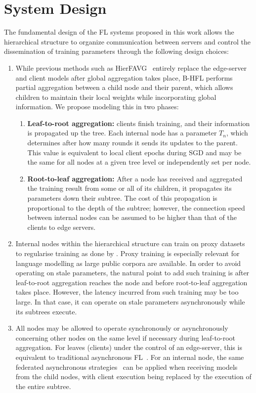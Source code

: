 \section{System Design}

The fundamental design of the FL systems proposed in this work allows the hierarchical structure to organize communication between servers and control the dissemination of training parameters through the following design choices:

\begin{enumerate}
    \item While previous methods such as HierFAVG~\citep{Client-Edge-CloudHierFL,Hier_Het_Cellular} entirely replace the edge-server and client models after global aggregation takes place, B-HFL performs partial aggregation between a child node and their parent, which allows children to maintain their local weights while incorporating global information. We propose modeling this in two phases:

          \begin{enumerate}
              \item \textbf{Leaf-to-root aggregation:} clients finish training, and their information is propagated up the tree. Each internal node has a parameter $T_n$, which determines after how many rounds it sends its updates to the parent. This value is equivalent to local client epochs during SGD and may be the same for all nodes at a given tree level or independently set per node.
              \item \textbf{Root-to-leaf aggregation:} After a node has received and aggregated the training result from some or all of its children, it propagates its parameters down their subtree. The cost of this propagation is proportional to the depth of the subtree; however, the connection speed between internal nodes can be assumed to be higher than that of the clients to edge servers.
          \end{enumerate}

    \item Internal nodes within the hierarchical structure can train on proxy datasets to regularise training as done by \citet{OneShotFL,FLwithNonIID}. Proxy training is especially relevant for language modelling as large public corpora are available. In order to avoid operating on stale parameters, the natural point to add such training is after leaf-to-root aggregation reaches the node and before root-to-leaf aggregation takes place. However, the latency incurred from such training may be too large. In that case, it can operate on stale parameters asynchronously while its subtrees execute.
    \item All nodes may be allowed to operate synchronously or asynchronously concerning other nodes on the same level if necessary during leaf-to-root aggregation. For leaves (clients) under the control of an edge-server, this is equivalent to traditional asynchronous FL~\citep{AsynchronousFLonHetDevicesSurvey}. For an internal node, the same federated asynchronous strategies~\citep{FedBuff,PAPAYA} can be applied when receiving models from the child nodes, with client execution being replaced by the execution of the entire subtree.
\end{enumerate}

